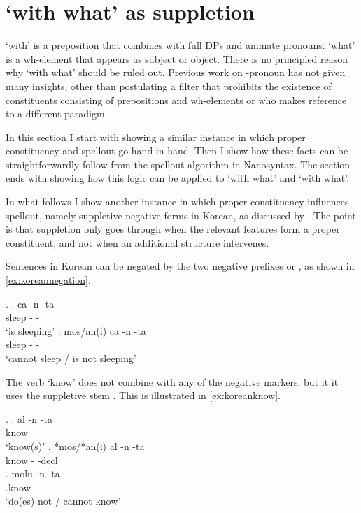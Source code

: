 \documentclass{article}
\begin{document}
\section{ `with what' as suppletion}\label{sec:suppletion}

 `with' is a preposition that combines with full DPs and animate pronouns.  `what' is a wh-element that appears as subject or object. There is no principled reason why  `with what' should be ruled out. Previous work on -pronoun has not given many insights, other than \citet{riemsdijk1978} postulating a filter that prohibits the existence of constituents consisting of prepositions and wh-elements or \citet{koopman2000} who makes reference to a different paradigm.

In this section I start with showing a similar instance in which proper constituency and spellout go hand in hand. Then I show how these facts can be straightforwardly follow from the spellout algorithm in Nanosyntax. The section ends with showing how this logic can be applied to  `with what' and  `with what'.

In what follows I show another instance in which proper constituency influences spellout, namely suppletive negative forms in Korean, as discussed by \citet{chung2007}. The point is that suppletion only goes through when the relevant features form a proper constituent, and not when an additional structure intervenes.

Sentences in Korean can be negated by the two negative prefixes  or , as shown in \ref{ex:koreannegation}.

\ex.\label{ex:koreannegation}
\ag. ca -n -ta\\
 sleep - -\\
 `is sleeping'
\bg. mos/an(i) ca -n -ta\\
  sleep - -\\
 `cannot sleep / is not sleeping' \hfill \citep{chung2007}

The verb  `know' does not combine with any of the negative markers, but it it uses the suppletive stem . This is illustrated in \ref{ex:koreanknow}.

\ex.\label{ex:koreanknow}
\ag. al -n -ta\\
know  \\
`know(s)'
\bg. *mos/*an(i) al -n -ta\\
 know - -decl\tsc{}\\
\bg. molu -n -ta\\
.know - -\\
`do(es) not / cannot know'\label{ex:molu} \hfill \citep{chung2007}
\end{document}
